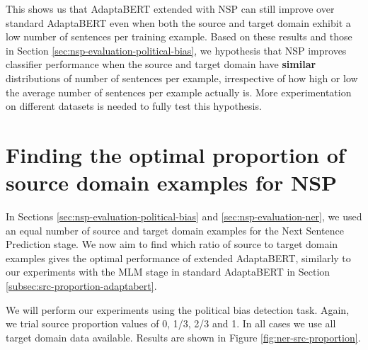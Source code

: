 This shows us that AdaptaBERT extended with NSP can still improve over standard AdaptaBERT even when both the source and target domain exhibit a low number of sentences per training example. Based on these results and those in Section \ref{sec:nsp-evaluation-political-bias}, we hypothesis that NSP improves classifier performance when the source and target domain have \textbf{similar} distributions of number of sentences per example, irrespective of how high or low the average number of sentences per example actually is. More experimentation on different datasets is needed to fully test this hypothesis.

\section{Finding the optimal proportion of source domain examples for NSP}

In Sections \ref{sec:nsp-evaluation-political-bias} and \ref{sec:nsp-evaluation-ner}, we used an equal number of source and target domain examples for the Next Sentence Prediction stage. We now aim to find which ratio of source to target domain examples gives the optimal performance of extended AdaptaBERT, similarly to our experiments with the MLM stage in standard AdaptaBERT in Section \ref{subsec:src-proportion-adaptabert}.

We will perform our experiments using the political bias detection task. Again, we trial source proportion values of 0, 1/3, 2/3 and 1. In all cases we use all target domain data available. Results are shown in Figure \ref{fig:ner-src-proportion}.

